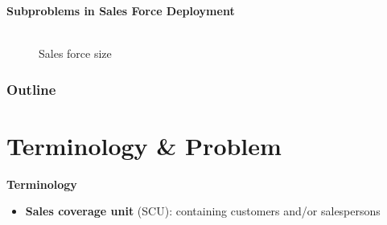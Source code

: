 \begin{frame}{\textbf{Subproblems in Sales Force Deployment}}
\begin{figure}
 \begin{minipage}[b]{0.45\linewidth} \centering
  \\
	Sales force size 
 \end{minipage}
	\vspace{0.5cm}
\end{figure}
\end{frame}


\begin{frame}
	\frametitle{\textbf{Outline}}
	\tableofcontents
	\end{frame}

\section{Terminology \& Problem}

\begin{frame}{\textbf{Terminology}}
\begin{itemize}
	\item \textbf{Sales coverage unit} (SCU): containing customers and/or salespersons


\end{itemize}


\end{frame}

